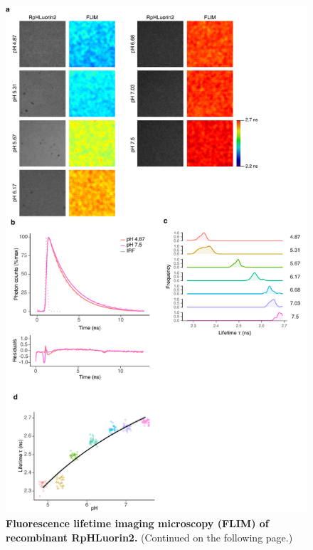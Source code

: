 \begin{figure}
    \includegraphics[keepaspectratio=true,width=\textwidth,height=\textheight]{chapters/chapter3/chapter3_Figure1.pdf}
    \caption{\textbf{Fluorescence lifetime imaging microscopy (FLIM) of recombinant RpHLuorin2.} (Continued on the following page.)}
    \label{fig:ch3fig1}
\end{figure}
